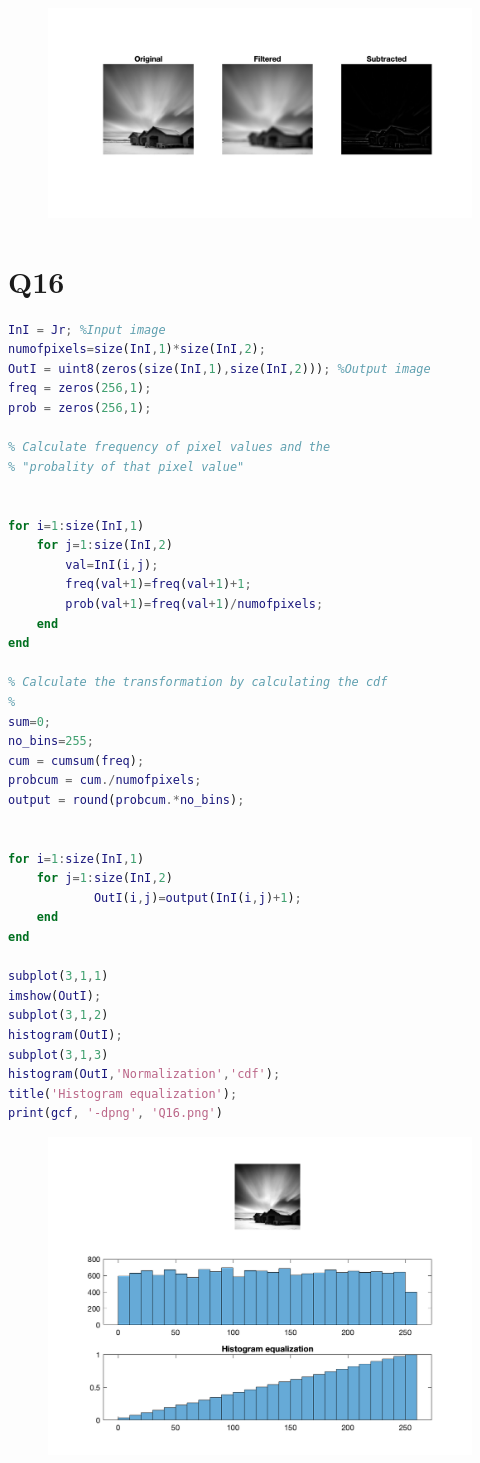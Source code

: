 \documentclass[oneside,a4paper]{article}
\begin{document}
\begin{figure}[ht!]
\centering
\includegraphics[width=140mm]{figures/Q15.png}
\caption{}
\label{fig:Q15}
\end{figure}

\section{Q16}
\begin{lstlisting}[language=MATLAB]
InI = Jr; %Input image
numofpixels=size(InI,1)*size(InI,2);
OutI = uint8(zeros(size(InI,1),size(InI,2))); %Output image
freq = zeros(256,1);
prob = zeros(256,1);

% Calculate frequency of pixel values and the 
% "probality of that pixel value"


for i=1:size(InI,1)
    for j=1:size(InI,2)
        val=InI(i,j);
        freq(val+1)=freq(val+1)+1;
        prob(val+1)=freq(val+1)/numofpixels;
    end
end

% Calculate the transformation by calculating the cdf 
% 
sum=0;
no_bins=255;
cum = cumsum(freq);
probcum = cum./numofpixels;
output = round(probcum.*no_bins);


for i=1:size(InI,1)
    for j=1:size(InI,2)
            OutI(i,j)=output(InI(i,j)+1);
    end
end

subplot(3,1,1)
imshow(OutI);
subplot(3,1,2)
histogram(OutI);
subplot(3,1,3)
histogram(OutI,'Normalization','cdf');
title('Histogram equalization');
print(gcf, '-dpng', 'Q16.png')
\end{lstlisting}

\begin{figure}[ht!]
\centering
\includegraphics[width=120mm]{figures/Q16.png}
\caption{}
\label{fig:Q16}
\end{figure}
\end{document}
